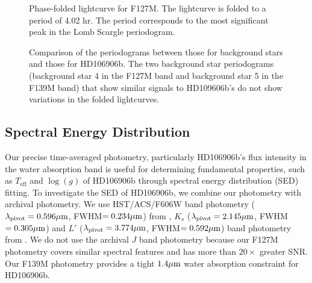 \documentclass[twocolumn]{aastex62}
\newcommand{\teff}{\ensuremath{T_{\mathrm{eff}}}\xspace}
\newcommand{\logg}{\ensuremath{\log(g)}\xspace}
\begin{document}
\begin{figure}[!ht]
  \centering
  \caption{Phase-folded lightcurve for F127M. The lightcurve is folded to a period of 4.02 hr. The period corresponds to the most significant peak in the Lomb Scargle periodogram.}
  \label{fig:fold}
\end{figure}

\begin{figure}[!ht]
  \centering
  \caption{Comparison of the periodograms between those for background stars and those for HD106906b. The two background star periodograms (background star 4 in the F127M band and background star 5 in the F139M band) that show similar signals to HD109606b's do not show variations in the folded lightcurves.}
  \label{fig:all-periodograms}
\end{figure}


\subsection{Spectral Energy Distribution}
Our precise time-averaged photometry, particularly HD106906b's flux intensity in the water absorption band is useful for determining fundamental properties, such as \teff{} and \logg{} of HD106906b through spectral energy distribution (SED) fitting.  To investigate the SED of HD106906b, we combine our photometry with archival photometry.  We use HST/ACS/F606W band photometry ($\lambda_{\mathrm{pivot}}=0.596\mbox{$\mu$m}$, FWHM$=0.234\mbox{$\mu$m}$) from \citet{Kalas2015}, $K_{s}$ ($\lambda_{\mathrm{pivot}}=2.145\mbox{$\mu$m}$, FWHM$=0.305\mbox{$\mu$m}$) and $L'$ ($\lambda_{\mathrm{pivot}}=3.774\mbox{$\mu$m}$, FWHM$=0.592\mbox{$\mu$m}$) band photometry from \citet{Bailey2013}. We do not use the archival $J$ band photometry \citep{Wu2016} because our F127M photometry covers similar spectral features and has more than $20\times$ greater SNR. Our F139M photometry provides a tight $1.4\mbox{$\mu$m}$ water absorption constraint for HD106906b.
\end{document}
